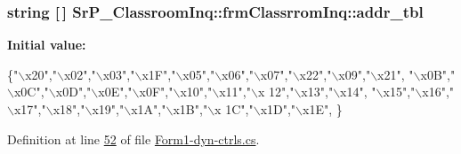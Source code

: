 \hypertarget{class_sr_p___classroom_inq_1_1frm_classrrom_inq_a0f417902be6534cb30d93b2c0d836165}{
\subsubsection[{addr\-\_\-tbl}]{\setlength{\rightskip}{0pt plus 5cm}string \mbox{[}$\,$\mbox{]} {\bf \-Sr\-P\-\_\-\-Classroom\-Inq\-::frm\-Classrrom\-Inq\-::addr\-\_\-tbl}}}
\label{class_sr_p___classroom_inq_1_1frm_classrrom_inq_a0f417902be6534cb30d93b2c0d836165}
{\bfseries \-Initial value\-:}
\begin{DoxyCode}
 \{\textcolor{stringliteral}{"\(\backslash\)x20"},\textcolor{stringliteral}{"\(\backslash\)x02"},\textcolor{stringliteral}{"\(\backslash\)x03"},\textcolor{stringliteral}{"\(\backslash\)x1F"},\textcolor{stringliteral}{"\(\backslash\)x05"},\textcolor{stringliteral}{"\(\backslash\)x06"},\textcolor{stringliteral}{"\(\backslash\)x07"},\textcolor{stringliteral}{"\(\backslash\)x22"},\textcolor{stringliteral}{"\(\backslash\)x09"},\textcolor{stringliteral}{"\(\backslash\)x21"},
                           \textcolor{stringliteral}{"\(\backslash\)x0B"},\textcolor{stringliteral}{"\(\backslash\)x0C"},\textcolor{stringliteral}{"\(\backslash\)x0D"},\textcolor{stringliteral}{"\(\backslash\)x0E"},\textcolor{stringliteral}{"\(\backslash\)x0F"},\textcolor{stringliteral}{"\(\backslash\)x10"},\textcolor{stringliteral}{"\(\backslash\)x11"},\textcolor{stringliteral}{"\(\backslash\)x
      12"},\textcolor{stringliteral}{"\(\backslash\)x13"},\textcolor{stringliteral}{"\(\backslash\)x14"},
                           \textcolor{stringliteral}{"\(\backslash\)x15"},\textcolor{stringliteral}{"\(\backslash\)x16"},\textcolor{stringliteral}{"\(\backslash\)x17"},\textcolor{stringliteral}{"\(\backslash\)x18"},\textcolor{stringliteral}{"\(\backslash\)x19"},\textcolor{stringliteral}{"\(\backslash\)x1A"},\textcolor{stringliteral}{"\(\backslash\)x1B"},\textcolor{stringliteral}{"\(\backslash\)x
      1C"},\textcolor{stringliteral}{"\(\backslash\)x1D"},\textcolor{stringliteral}{"\(\backslash\)x1E"},
                            \}
\end{DoxyCode}


\-Definition at line \hyperlink{_form1-dyn-ctrls_8cs_source_l00052}{52} of file \hyperlink{_form1-dyn-ctrls_8cs_source}{\-Form1-\/dyn-\/ctrls.\-cs}.

